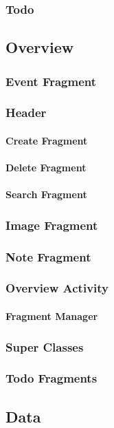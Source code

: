 	\subsubsection{Todo}

\subsection{Overview}
	\subsubsection{Event Fragment}
	\subsubsection{Header}
		\paragraph{Create Fragment}
		\paragraph{Delete Fragment}
		\paragraph{Search Fragment}
	\subsubsection{Image Fragment}
	\subsubsection{Note Fragment}
	\subsubsection{Overview Activity}
		\paragraph{Fragment Manager}
	\subsubsection{Super Classes}
	\subsubsection{Todo Fragments}


\subsection{Data}
